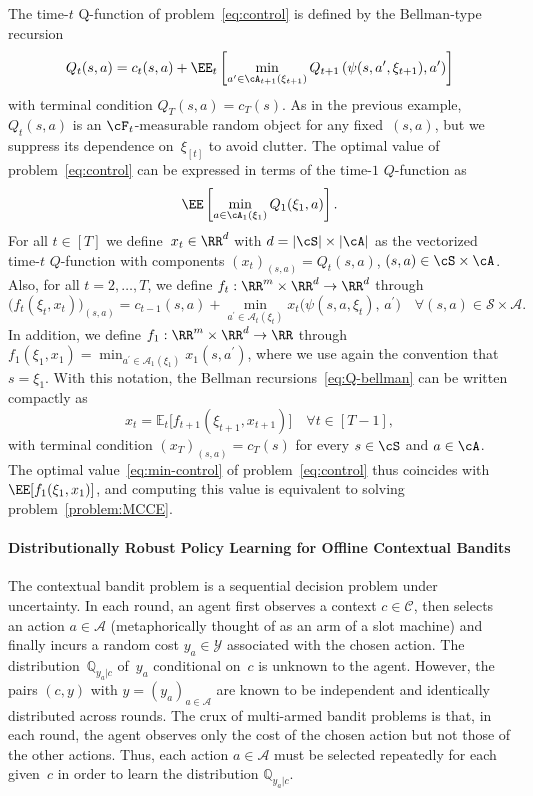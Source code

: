 \documentclass[11pt]{article}
\begin{document}
The time-$t$ Q-function of problem~\eqref{eq:control} is defined by the Bellman-type recursion
\begin{equation}\label{eq:Q-bellman}
 Q_t(s,a)=c_t(s,a) + \EE_t\left[\min_{a^\prime\in\cA_{t+1}(\xi_{t+1})} Q_{t+1}\left(\psi(s,a', \xi_{t+1}),a' \right)\right]
\end{equation}
with terminal condition $Q_T(s,a) = c_T(s)$. As in the previous example, $ Q_t(s,a)$ is an $\cF_t$-measurable random object for any fixed~$(s,a)$, but we suppress its dependence on~$\xi_{[t]}$ to avoid clutter. The optimal value of problem~\eqref{eq:control} can be expressed in terms of the time-$1$ $Q$-function as
\begin{equation}\label{eq:min-control}
    \EE\left[\min_{a\in\cA_1(\xi_1)} Q_1(\xi_1,a)\right].
\end{equation}
For all $t\in[T]$ we define~$x_t \in\RR^{d}$ with $d=|\cS|\times|\cA|$ as the vectorized time-$t$ $Q$-function with components $(x_t)_{(s,a)}= Q_t(s,a)$, $(s,a)\in\cS\times\cA$. Also, for all $t=2,\ldots,T$, we define $f_{t}:\RR^{m}\times \RR^{d}\rightarrow\RR^{d}$ through
\[
    \big( f_{t}(\xi_{t}, x_{t})\big)_{(s,a)} = c_{t-1}(s,a)  + \min_{a^\prime \in \mathcal A_{t}(\xi_{t})} x_{t}\big(\psi(s,a,\xi_{t}),\,a^\prime\big)\quad \forall (s,a)\in \mathcal S \times \mathcal A.
\]
In addition, we define $f_1:\RR^{m}\times \RR^{d}\rightarrow \RR$ through $f_1 (\xi_1,x_1) =  \min_{a^\prime \in \mathcal A_{1}(\xi_{1})} x_{1}(s,a^\prime)$, where we use again the convention that $s=\xi_1$. With this notation, the Bellman recursions~\eqref{eq:Q-bellman} can be written compactly as
\[
    x_t = \mathbb E_t\big[f_{t+1}(\xi_{t+1}, x_{t+1})\big] \quad \forall t \in [T-1],
\]
with terminal condition $(x_T)_{(s,a)}=c_T(s)$ for every $s\in\cS$ and $a\in\cA$. The optimal value~\eqref{eq:min-control} of problem~\eqref{eq:control} thus coincides with $\EE[f_1(\xi_1,x_1)]$, and computing this value is equivalent to solving problem~\eqref{problem:MCCE}.


\paragraph{Distributionally Robust Policy Learning for Offline Contextual Bandits}
\label{sec:application_dro}
    The contextual bandit problem is a sequential decision problem under uncertainty. In each round, an agent first observes a context $c\in\mathcal C$, then selects an action $a\in\mathcal A$ (metaphorically thought of as an arm of a slot machine) and finally incurs a random cost $y_a\in\mathcal Y$ associated with the chosen action. The distribution~$\mathbb Q_{y_a|c}$ of~$y_a$ conditional on~$c$ is unknown to the agent. However, the pairs $(c,y)$ with $y=(y_a)_{a\in\mathcal A}$ are known to be independent and identically distributed across rounds. The crux of multi-armed bandit problems is that, in each round, the agent observes only the cost of the chosen action but not those of the other actions. Thus, each action $a\in\mathcal A$ must be selected repeatedly for each given~$c$ in order to learn the distribution $\mathbb Q_{y_a|c}$. 
    
\end{document}
